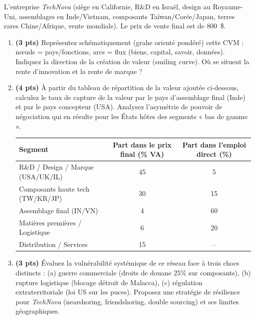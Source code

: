 \documentclass[11pt]{article}
\begin{document}
\begin{exercice}
L'entreprise \textit{TechNova} (siège en Californie, R\&D en Israël, design au Royaume-Uni, assemblages en Inde/Vietnam, composants Taïwan/Corée/Japan, terres rares Chine/Afrique, vente mondiale). Le prix de vente final est de \SI{800}{\$}.

\begin{enumerate}
    \item \textbf{(3 pts)} Représentez schématiquement (grahe orienté pondéré) cette CVM : nœuds = pays/fonctions, arcs = flux (biens, capital, savoir, données). Indiquez la direction de la création de valeur (smiling curve). Où se situent la rente d'innovation et la rente de marque ?
    \item \textbf{(4 pts)} À partir du tableau de répartition de la valeur ajoutée ci-dessous, calculez le taux de capture de la valeur par le pays d'assemblage final (Inde) et par le pays concepteur (USA). Analysez l'asymétrie de pouvoir de négociation qui en résulte pour les États hôtes des segments « bas de gamme ».
    \begin{center}
    \begin{tabular}{lcc}
    \toprule
    Segment & Part dans le prix final (\% VA) & Part dans l'emploi direct (\%)\\
    \midrule
    R\&D / Design / Marque (USA/UK/IL) & 45 & 5 \\
    Composants haute tech (TW/KR/JP) & 30 & 15 \\
    Assemblage final (IN/VN) & 4 & 60 \\
    Matières premières / Logistique & 6 & 20 \\
    Distribution / Services & 15 & -- \\
    \bottomrule
    \end{tabular}
    \end{center}
    \item \textbf{(3 pts)} Évaluez la vulnérabilité systémique de ce réseau face à trois chocs distincts : (a) guerre commerciale (droits de douane 25\% sur composants), (b) rupture logistique (blocage détroit de Malacca), (c) régulation extraterritoriale (loi US sur les puces). Proposez une stratégie de résilience pour \textit{TechNova} (nearshoring, friendshoring, double sourcing) et ses limites géographiques.
\end{enumerate}
\end{exercice}
\end{document}
